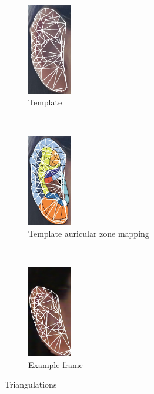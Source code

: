 \begin{figure}
  \centering
  \begin{subfigure}[t]{0.3\columnwidth}
      \centering
      \includegraphics[height=4cm]{figures/triangle.jpg}
      \caption{Template}
      \label{fig:triangle-origin}
  \end{subfigure}%
  ~ 
  \begin{subfigure}[t]{0.3\columnwidth}
      \centering
      \includegraphics[height=4cm]{figures/triangle_recolor.jpg}
      \caption{Template auricular zone mapping}
      \label{fig:triangle-template}
  \end{subfigure}
  ~ 
  \begin{subfigure}[t]{0.3\columnwidth}
      \centering
      \includegraphics[height=4cm]{figures/triangle_dest.jpg}
      \caption{Example frame}
      \label{fig:triangle-example}
  \end{subfigure}

  \caption{Triangulations}
  \label{fig:triangulation}
\end{figure}


